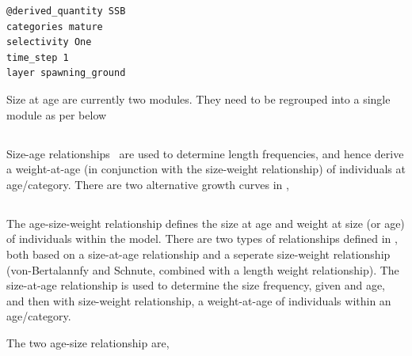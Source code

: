 \begin{verbatim}
@derived_quantity SSB
categories mature
selectivity One
time_step 1
layer spawning_ground
\end{verbatim}

\TOUNDO
 Size at age are currently two modules. They need to be regrouped into a single module as per below

\subsection{\label{sec:size-at-age}}

Size-age relationships \NYI\ are used to determine length frequencies, and hence derive a  weight-at-age (in conjunction with the size-weight relationship) of individuals at age/category. There are two alternative growth curves in \SPM, 


\subsection{\label{sec:mean-weight}}

\TOUNDOend

\TODO

\subsection{\label{sec:age-size-weight}}

The age-size-weight relationship defines the size at age and weight at size (or age) of individuals within the model. There are two types of relationships defined in \SPM, both based on a size-at-age relationship and a seperate size-weight relationship (von-Bertalannfy and Schnute, combined with a length weight relationship). The size-at-age relationship is used to determine the size frequency, given and age, and then with size-weight relationship, a weight-at-age of individuals within an age/category.

The two age-size relationship are,

